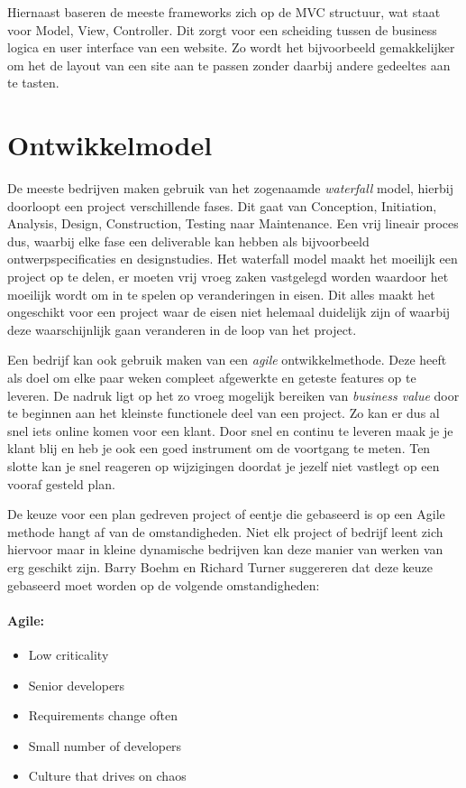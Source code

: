 \documentclass[12pt, a4paper]{article}
\begin{document}
Hiernaast baseren de meeste frameworks zich op de MVC structuur, wat staat voor Model, View, Controller. Dit zorgt voor een scheiding tussen de business logica en user interface van een website. Zo wordt het bijvoorbeeld gemakkelijker om het de layout van een site aan te passen zonder daarbij andere gedeeltes aan te tasten.

\section{Ontwikkelmodel}

De meeste bedrijven maken gebruik van het zogenaamde \emph{waterfall} model, hierbij doorloopt een project verschillende fases. Dit gaat van Conception, Initiation, Analysis, Design, Construction, Testing naar Maintenance. Een vrij lineair proces dus, waarbij elke fase een deliverable kan hebben als bijvoorbeeld ontwerpspecificaties en designstudies. Het waterfall model maakt het moeilijk een project op te delen, er moeten vrij vroeg zaken vastgelegd worden waardoor het moeilijk wordt om in te spelen op veranderingen in eisen. Dit alles maakt het ongeschikt voor een project waar de eisen niet helemaal duidelijk zijn of waarbij deze waarschijnlijk gaan veranderen in de loop van het project.

Een bedrijf kan ook gebruik maken van een \emph{agile} ontwikkelmethode. Deze heeft als doel om elke paar weken compleet afgewerkte en geteste features op te leveren. De nadruk ligt op het zo vroeg mogelijk bereiken van \emph{business value} door te beginnen aan het kleinste functionele deel van een project. Zo kan er dus al snel iets online komen voor een klant. Door snel en continu te leveren maak je je klant blij en heb je ook een goed instrument om de voortgang te meten. Ten slotte kan je snel reageren op wijzigingen doordat je jezelf niet vastlegt op een vooraf gesteld plan.

De keuze voor een plan gedreven project of eentje die gebaseerd is op een Agile methode hangt af van de omstandigheden. Niet elk project of bedrijf leent zich hiervoor maar in kleine dynamische bedrijven kan deze manier van werken van erg geschikt zijn. Barry Boehm en Richard Turner\cite{agilebook} suggereren dat deze keuze gebaseerd moet worden op de volgende omstandigheden:

\paragraph{Agile:}
\begin{itemize}
  \item Low criticality
  \item Senior developers
  \item Requirements change often
  \item Small number of developers
  \item Culture that drives on chaos
\end{itemize}
\end{document}

